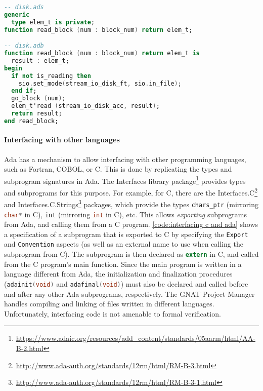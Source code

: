 \begin{lstlisting}[caption={Generic function for reading a block of type \textnormal{elem\_t}}, label={code:generic reading function}, language=Ada]
-- disk.ads
generic
  type elem_t is private;
function read_block (num : block_num) return elem_t;

-- disk.adb
function read_block (num : block_num) return elem_t is
  result : elem_t;
begin
  if not is_reading then
    sio.set_mode(stream_io_disk_ft, sio.in_file);
  end if;
  go_block (num);
  elem_t'read (stream_io_disk_acc, result);
  return result;
end read_block;
\end{lstlisting}

\paragraph{Interfacing with other languages}
Ada has a mechanism to allow interfacing with other programming languages, such as Fortran, COBOL, or C.
This is done by replicating the types and subprogram signatures in Ada.
The Interfaces library package\footnote{\url{https://www.adaic.org/resources/add_content/standards/05aarm/html/AA-B-2.html}} provides types and subprograms for this purpose.
For example, for C, there are the Interfaces.C\footnote{\url{http://www.ada-auth.org/standards/12rm/html/RM-B-3.html}} and Interfaces.C.Strings\footnote{\url{http://www.ada-auth.org/standards/12rm/html/RM-B-3-1.html}} packages, which provide the types \lstinline[language=Ada]{chars_ptr} (mirroring \lstinline[language=C]{char*} in C), \lstinline[language=Ada]{int} (mirroring \lstinline[language=C]{int} in C), etc.
This allows \textit{exporting} subprograms from Ada, and calling them from a C program.
\autoref{code:interfacing c and ada} shows a specification of a subprogram that is exported to C by specifying the \lstinline[language=Ada]{Export} and \lstinline[language=Ada]{Convention} aspects (as well as an external name to use when calling the subprogram from C).
The subprogram is then declared as \lstinline[language=C]{extern} in C, and called from the C program's main function.
Since the main program is written in a language different from Ada, the initialization and finalization procedures (\lstinline[language=C]{adainit(void)} and \lstinline[language=C]{adafinal(void)}) must also be declared and called before and after any other Ada subprograms, respectively.
The GNAT Project Manager handles compiling and linking of files written in different languages.
Unfortunately, interfacing code is not amenable to formal verification.

